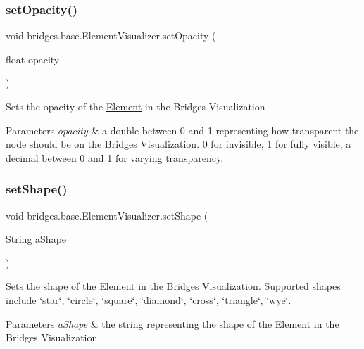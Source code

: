 \subsubsection{\texorpdfstring{setOpacity()}{setOpacity()}}
{\footnotesize\ttfamily void bridges.\+base.\+Element\+Visualizer.\+set\+Opacity (\begin{DoxyParamCaption}\item[{float}]{opacity }\end{DoxyParamCaption})}

Sets the opacity of the \mbox{\hyperlink{classbridges_1_1base_1_1_element}{Element}} in the Bridges Visualization


\begin{DoxyParams}{Parameters}
{\em opacity} & a double between 0 and 1 representing how transparent the node should be on the Bridges Visualization. 0 for invisible, 1 for fully visible, a decimal between 0 and 1 for varying transparency. \\
\hline
\end{DoxyParams}
\mbox{\label{classbridges_1_1base_1_1_element_visualizer_ac3bad991904c8ad23e5233b341381d93}} 
\subsubsection{\texorpdfstring{setShape()}{setShape()}}
{\footnotesize\ttfamily void bridges.\+base.\+Element\+Visualizer.\+set\+Shape (\begin{DoxyParamCaption}\item[{String}]{a\+Shape }\end{DoxyParamCaption})}

Sets the shape of the \mbox{\hyperlink{classbridges_1_1base_1_1_element}{Element}} in the Bridges Visualization. Supported shapes include \char`\"{}star\char`\"{}, \char`\"{}circle\char`\"{}, \char`\"{}square\char`\"{}, \char`\"{}diamond\char`\"{}, \char`\"{}cross\char`\"{}, \char`\"{}triangle\char`\"{}, \char`\"{}wye\char`\"{}.


\begin{DoxyParams}{Parameters}
{\em a\+Shape} & the string representing the shape of the \mbox{\hyperlink{classbridges_1_1base_1_1_element}{Element}} in the Bridges Visualization \\
\hline
\end{DoxyParams}
\mbox{\label{classbridges_1_1base_1_1_element_visualizer_aba410184f7df495594fc1fa7948335a5}} 
